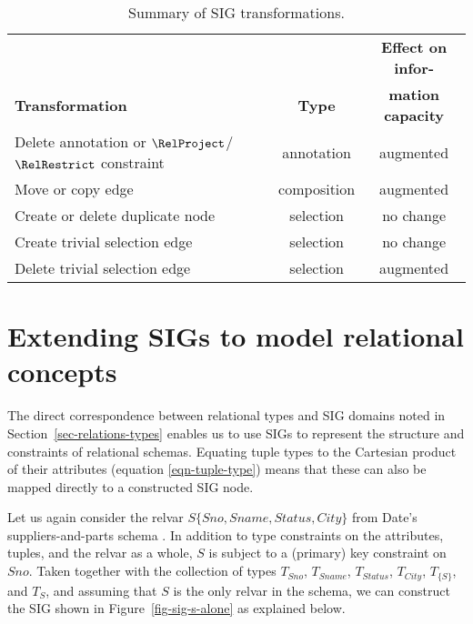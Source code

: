 \documentclass{sig-alternate-05-2015}
\newcounter{constraint}
\newcommand{\Sno}{\ensuremath{\mathit{Sno}}}
\newcommand{\Sname}{\ensuremath{\mathit{Sname}}}
\newcommand{\Status}{\ensuremath{\mathit{Status}}}
\newcommand{\City}{\ensuremath{\mathit{City}}}
\newcommand{\T}[1]{\ensuremath{T_{#1}}}
\newcommand{\TT}[1]{\ensuremath{T_{\{#1\}}}}
\begin{document}
\begin{table}[htb]
    \centering
    \small
    \begin{tabular}{lcc}
        \toprule
                                                        &                   &   \textbf{Effect on infor-}   \\
        \textbf{Transformation}                         &   \textbf{Type}   &   \textbf{mation capacity}    \\
        \midrule
        Delete annotation or \(\RelProject\)/\(\RelRestrict\) constraint    &   annotation      &   augmented   \\
        Move or copy edge                               &   composition     &   augmented   \\
        Create or delete duplicate node                 &   selection       &   no change   \\
        Create trivial selection edge                   &   selection       &   no change   \\
        Delete trivial selection edge                   &   selection       &   augmented   \\
        \bottomrule
    \end{tabular}
    \caption{Summary of SIG transformations.}
    \label{Tab.SIG.Transformations}
\end{table}




\section{Extending SIGs to model relational concepts}
\label{sec-relational-sigs}

\noindent The direct correspondence between relational types and SIG domains noted in Section~\ref{sec-relations-types} enables us to use SIGs to represent the structure and constraints of relational schemas. Equating tuple types to the Cartesian product of their attributes (equation \ref{eqn-tuple-type}) means that these can also be mapped directly to a constructed SIG node.

Let us again consider the relvar \(S\{\Sno, \Sname, \Status, \City\}\) from Date's suppliers-and-parts schema \cite{Date.C-2013a-View}. In addition to type constraints on the attributes, tuples, and the relvar as a whole, \(S\) is subject to a (primary) key constraint on \Sno. Taken together with the collection of types \(\T{\Sno}\), \(\T{\Sname}\), \(\T{\Status}\), \(\T{\City}\), \(\TT{S}\), and \(\T{S}\), and assuming that \(S\) is the only relvar in the schema, we can construct the SIG shown in Figure~\ref{fig-sig-s-alone} as explained below.
\end{document}
